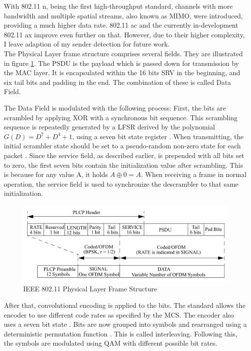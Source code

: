 With 802.11 n, being the first high-throughput standard, channels with more bandwidth and multiple spatial streams, also known as \gls{MIMO}, were introduced, providing a much higher data rate. 802.11 ac and the currently in-development 802.11 ax improve even further on that. However, due to their higher complexity, I leave adaption of my sender detection for future work.\\

The Physical Layer frame structure comprises several fields. They are illustrated in figure \ref{fig:phy-format}. The \gls{PSDU} is the payload which is passed down for transmission by the \gls{MAC} layer. It is encapsulated within the 16 bits \gls{SRV} in the beginning, and six tail bits and padding in the end. The combination of these is called Data Field.

The Data Field is modulated with the following process: First, the bits are scrambled by applying XOR with a synchronous bit sequence. This scrambling sequence is repeatedly generated by a \gls{LFSR} derived by the polynomial $G(D)=D^7+D^4+1$, using a seven bit state register \cite{ieee2012}. When transmitting, the initial scrambler state should be set to a pseudo-random non-zero state for each packet \cite{ieee2012}. Since the service field, as described earlier, is prepended with all bits set to zero, the first seven bits contain the initialization value after scrambling. This is because for any value A, it holds $A \oplus 0 = A$. When receiving a frame in normal operation, the service field is used to synchronize the descrambler to that same initialization.

\begin{figure}[H]
	\centering
	\includegraphics[width=\textwidth]{gfx/images/phy-format}
	\caption[IEEE 802.11 Physical Layer Frame Structure]{IEEE 802.11 Physical Layer Frame Structure \cite{ieee2012}}
	\label{fig:phy-format}
\end{figure}

After that, convolutional encoding is applied to the bits. The standard allows the encoder to use different code rates as specified by the \gls{MCS}. The encoder also uses a seven bit state \cite{park2009}. Bits are now grouped into symbols and rearranged using a deterministic permutation function \cite{perahia2013}. This is called interleaving. Following this, the symbols are modulated using \gls{QAM} with different possible bit rates.\\

